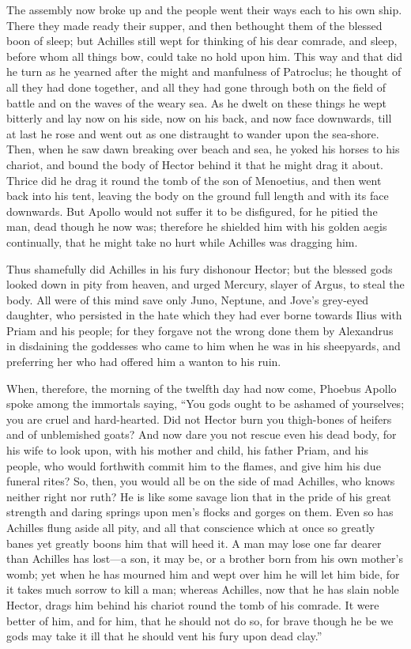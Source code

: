 The assembly now broke up and the people went their ways each to his own
ship. There they made ready their supper, and then bethought them of the
blessed boon of sleep; but Achilles still wept for thinking of his dear
comrade, and sleep, before whom all things bow, could take no hold upon
him. This way and that did he turn as he yearned after the might and
manfulness of Patroclus; he thought of all they had done together, and all
they had gone through both on the field of battle and on the waves of the
weary sea. As he dwelt on these things he wept bitterly and lay now on his
side, now on his back, and now face downwards, till at last he rose and
went out as one distraught to wander upon the sea-shore. Then, when he saw
dawn breaking over beach and sea, he yoked his horses to his chariot, and
bound the body of Hector behind it that he might drag it about. Thrice did
he drag it round the tomb of the son of Menoetius, and then went back into
his tent, leaving the body on the ground full length and with its face
downwards. But Apollo would not suffer it to be disfigured, for he pitied
the man, dead though he now was; therefore he shielded him with his golden
aegis continually, that he might take no hurt while Achilles was dragging
him.

Thus shamefully did Achilles in his fury dishonour Hector; but the blessed
gods looked down in pity from heaven, and urged Mercury, slayer of Argus,
to steal the body. All were of this mind save only Juno, Neptune, and
Jove’s grey-eyed daughter, who persisted in the hate which they had ever
borne towards Ilius with Priam and his people; for they forgave not the
wrong done them by Alexandrus in disdaining the goddesses who came to him
when he was in his sheepyards, and preferring her who had offered him a
wanton to his ruin.

When, therefore, the morning of the twelfth day had now come, Phoebus
Apollo spoke among the immortals saying, “You gods ought to be ashamed of
yourselves; you are cruel and hard-hearted. Did not Hector burn you
thigh-bones of heifers and of unblemished goats? And now dare you not
rescue even his dead body, for his wife to look upon, with his mother and
child, his father Priam, and his people, who would forthwith commit him to
the flames, and give him his due funeral rites? So, then, you would all be
on the side of mad Achilles, who knows neither right nor ruth? He is like
some savage lion that in the pride of his great strength and daring
springs upon men’s flocks and gorges on them. Even so has Achilles flung
aside all pity, and all that conscience which at once so greatly banes yet
greatly boons him that will heed it. A man may lose one far dearer than
Achilles has lost—a son, it may be, or a brother born from his own
mother’s womb; yet when he has mourned him and wept over him he will let
him bide, for it takes much sorrow to kill a man; whereas Achilles, now
that he has slain noble Hector, drags him behind his chariot round the
tomb of his comrade. It were better of him, and for him, that he should
not do so, for brave though he be we gods may take it ill that he should
vent his fury upon dead clay.”

